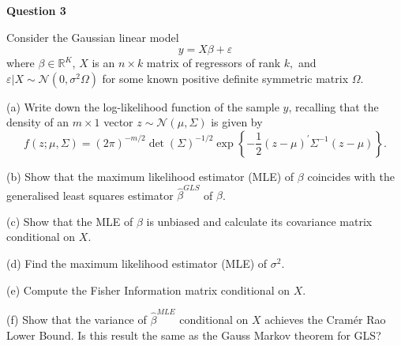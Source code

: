 \documentclass{article}
\begin{document}
\bigskip

\textbf{Question 3 }

Consider the Gaussian linear model%
\begin{equation*}
y=X\beta +\varepsilon 
\end{equation*}%
where $\beta \in \mathbb{R}^{K}$, $X$ is an $n\times k$ matrix of regressors
of rank $k,$ and $\varepsilon |X\sim \mathcal{N}\left( 0,\sigma ^{2}\Omega
\right) $ for some known positive definite symmetric matrix $\Omega $.

(a) Write down the log-likelihood function of the sample $y$, recalling that
the density of an $m\times 1$ vector $z\sim \mathcal{N}\left( \mu ,\Sigma
\right) $ is given by 
\begin{equation*}
f\left( z;\mu ,\Sigma \right) =\left( 2\pi \right) ^{-m/2}\det \left( \Sigma
\right) ^{-1/2}\exp \left\{ -\frac{1}{2}\left( z-\mu \right) ^{\prime
}\Sigma ^{-1}\left( z-\mu \right) \right\} .
\end{equation*}

(b) Show that the maximum likelihood estimator (MLE) of $\beta $ coincides
with the generalised least squares estimator $\hat{\beta}^{GLS}$ of $\beta $.

(c) Show that the MLE of $\beta $ is unbiased and calculate its covariance
matrix conditional on $X$.

(d) Find the maximum likelihood estimator (MLE) of $\sigma ^{2}$.

(e) Compute the Fisher Information matrix conditional on $X$. 

(f) Show that the variance of $\hat{\beta}^{MLE}$ conditional on $X$
achieves the Cram\'{e}r Rao Lower Bound. Is this result the same as the
Gauss Markov theorem for GLS?
\end{document}
